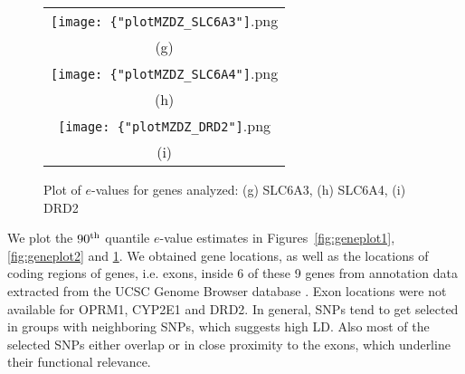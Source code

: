 \begin{figure}
\begin{center}

\begin{tabular}{c}
		\texttt{[image: \{"plotMZDZ\_SLC6A3"]}.png}\\
		(g)\\
		\texttt{[image: \{"plotMZDZ\_SLC6A4"]}.png} \\
		(h)\\	
		\texttt{[image: \{"plotMZDZ\_DRD2"]}.png}\\
		(i)\\	
\end{tabular}

\caption{Plot of $e$-values for genes analyzed: (g) SLC6A3, (h) SLC6A4, (i) DRD2}
\label{fig:geneplot3}

\end{center}
\end{figure}

We plot the $90^{\operatorname*{th}}$ quantile $e$-value estimates in Figures~\ref{fig:geneplot1}, \ref{fig:geneplot2} and \ref{fig:geneplot3}. We obtained gene locations, as well as the locations of coding regions of genes, i.e. exons, inside 6 of these 9 genes from annotation data extracted from the UCSC Genome Browser database \citep{UCSCdata}. Exon locations were not available for OPRM1, CYP2E1 and DRD2. In general, SNPs tend to get selected in groups with neighboring SNPs, which suggests high LD. Also most of the selected SNPs either overlap or in close proximity to the exons, which underline their functional relevance.
